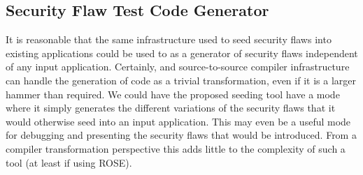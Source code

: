 \subsection{Security Flaw Test Code Generator}
         \label{sec:SecurityFlawGenerator}
         It is reasonable that the same infrastructure used to seed security flaws into
         existing applications could be used to as a generator of security flaws
         independent of any input application.
         Certainly, and source-to-source compiler infrastructure can handle the generation
         of code as a trivial transformation, even if it is a larger hammer than required.
         We could have the proposed seeding tool have a mode where it simply generates
         the different variations of the security flaws that it would otherwise seed into
         an input application.  This may even be a useful mode for debugging and
         presenting the security flaws that would be introduced.  From a compiler
         transformation perspective this adds little to the complexity of such a tool
         (at least if using ROSE).

